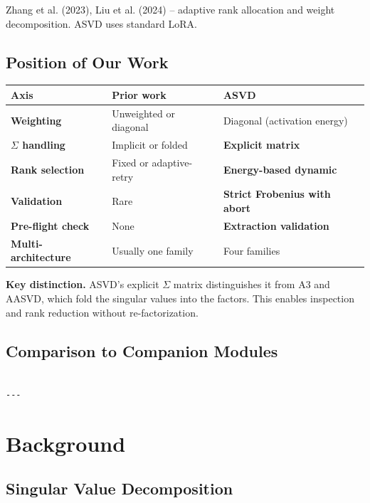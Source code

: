 Zhang et al. (2023), Liu et al. (2024) -- adaptive rank allocation and 
weight decomposition. ASVD uses standard LoRA.

\subsection{Position of Our Work}

\begin{table}[H]
\centering
\small
\begin{tabular}{lll}
\toprule
\textbf{Axis} & \textbf{Prior work} & \textbf{ASVD} \\
\midrule
\textbf{Weighting} & Unweighted or diagonal & Diagonal (activation energy) \\
\textbf{$\Sigma$ handling} & Implicit or folded & \textbf{Explicit matrix} \\
\textbf{Rank selection} & Fixed or adaptive-retry & \textbf{Energy-based dynamic} \\
\textbf{Validation} & Rare & \textbf{Strict Frobenius with abort} \\
\textbf{Pre-flight check} & None & \textbf{Extraction validation} \\
\textbf{Multi-architecture} & Usually one family & Four families \\
\bottomrule
\end{tabular}
\end{table}

\textbf{Key distinction.} ASVD's explicit $\Sigma$ matrix distinguishes it from 
A3 and AASVD, which fold the singular values into the factors. This enables 
inspection and rank reduction without re-factorization.

\subsection{Comparison to Companion Modules}

\begin{lstlisting}

---
\end{lstlisting}


\section{Background}

\subsection{Singular Value Decomposition}

